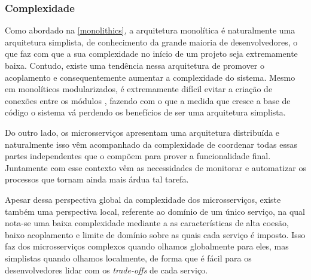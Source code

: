 \subsubsection{Complexidade}
\label{pers:complexidade}

Como abordado na \autoref{monolithics}, a arquitetura monolítica é naturalmente uma arquitetura
simplista, de conhecimento da grande maioria de desenvolvedores, o que faz com que a sua
complexidade no início de um projeto seja extremamente baixa. Contudo, existe uma tendência nessa
arquitetura de promover o acoplamento e consequentemente aumentar a complexidade do sistema. Mesmo
em monolíticos modularizados, é extremamente difícil evitar a criação de conexões entre os módulos
\cite{StefanTilkov:DontStartWithAMonolith}, fazendo com o que a medida que cresce a base de código
o sistema vá perdendo os benefícios de ser uma arquitetura simplista.

Do outro lado, os microsserviços apresentam uma arquitetura distribuída e naturalmente isso vêm
acompanhado da complexidade de coordenar todas essas partes independentes que o compõem para prover
a funcionalidade final. Juntamente com esse contexto vêm as necessidades de monitorar e automatizar
os processos que tornam ainda mais árdua tal tarefa.

Apesar dessa perspectiva global da complexidade dos microsserviços, existe também uma perspectiva
local, referente ao domínio de um único serviço, na qual nota-se uma baixa complexidade mediante a
as características de alta coesão, baixo acoplamento e limite de domínio sobre as quais cada serviço
é imposto. Isso faz dos microsserviços complexos quando olhamos globalmente para eles, mas
simplistas quando olhamos localmente, de forma que é fácil para os desenvolvedores lidar com os
\textit{trade-offs} de cada serviço.
